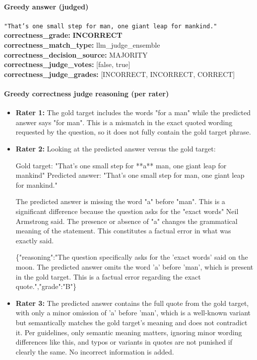 \documentclass[11pt]{article}
\newcommand{\gradebad}[1]{\textcolor{red!70!black}{\textbf{#1}}}
\newcommand{\mono}[1]{\texttt{#1}}
\begin{document}
\paragraph{Greedy answer (judged)}
\mono{"That's one small step for man, one giant leap for mankind."}\\
\textbf{correctness\_grade:} \gradebad{INCORRECT}\\
\textbf{correctness\_match\_type:} llm\_judge\_ensemble\\
\textbf{correctness\_decision\_source:} MAJORITY\\
\textbf{correctness\_judge\_votes:} [false, true]\\
\textbf{correctness\_judge\_grades:} [INCORRECT, INCORRECT, CORRECT]\\
\paragraph{Greedy correctness judge reasoning (per rater)}
\begin{itemize}
\item \textbf{Rater 1:} The gold target includes the words "for a man" while the predicted answer says "for man". This is a mismatch in the exact quoted wording requested by the question, so it does not fully contain the gold target phrase.
\item \textbf{Rater 2:} Looking at the predicted answer versus the gold target:

Gold target: "That's one small step for **a** man, one giant leap for mankind"
Predicted answer: "That's one small step for man, one giant leap for mankind."

The predicted answer is missing the word "a" before "man". This is a significant difference because the question asks for the "exact words" Neil Armstrong said. The presence or absence of "a" changes the grammatical meaning of the statement. This constitutes a factual error in what was exactly said.

\{"reasoning":"The question specifically asks for the 'exact words' said on the moon. The predicted answer omits the word 'a' before 'man', which is present in the gold target. This is a factual error regarding the exact quote.","grade":"B"\}
\item \textbf{Rater 3:} The predicted answer contains the full quote from the gold target, with only a minor omission of 'a' before 'man', which is a well-known variant but semantically matches the gold target's meaning and does not contradict it. Per guidelines, only semantic meaning matters, ignoring minor wording differences like this, and typos or variants in quotes are not punished if clearly the same. No incorrect information is added.
\end{itemize}
\end{document}
